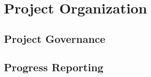 \documentclass[letterpaper,10pt,openany,oneside,english]{sphinxmanual}
\begin{document}
\chapter{Project Organization}
\label{\detokenize{projectorganization:project-organization}}\label{\detokenize{projectorganization::doc}}

\section{Project Governance}
\label{\detokenize{projectorganization:project-governance}}

\section{Progress Reporting}
\label{\detokenize{projectorganization:progress-reporting}}

\chapter{}
\label{\detokenize{index:document-author-s}}

\section{}
\label{\detokenize{index:datro-consortium}}


\renewcommand{\indexname}{Index}
\printindex
\end{document}
